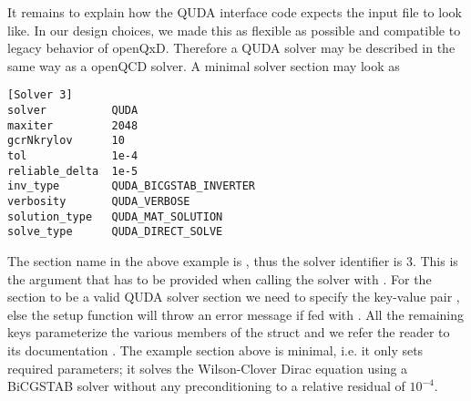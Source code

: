 It remains to explain how the QUDA interface code expects the input file to look like. In our design choices, we made this as flexible as possible and compatible to legacy behavior of openQxD. Therefore a QUDA solver may be described in the same way as a openQCD solver. A minimal solver section may look as
\begin{verbatim}
[Solver 3]
solver          QUDA
maxiter         2048
gcrNkrylov      10
tol             1e-4
reliable_delta  1e-5
inv_type        QUDA_BICGSTAB_INVERTER
verbosity       QUDA_VERBOSE
solution_type   QUDA_MAT_SOLUTION
solve_type      QUDA_DIRECT_SOLVE
\end{verbatim}
The section name in the above example is , thus the solver identifier is 3.
This is the argument  that has to be provided when
calling the solver with .
For the section to be a valid QUDA solver section we need to specify the key-value pair ,
else the setup function will throw an error message if
fed with . All the remaining keys parameterize the
various members of the  struct and we refer
the reader to its documentation \cite{QUDApaper,github:quda}. The example section above is minimal, i.e. it only sets required parameters; it solves the Wilson-Clover Dirac equation using a BiCGSTAB solver without any preconditioning to a relative residual of $10^{-4}$.





